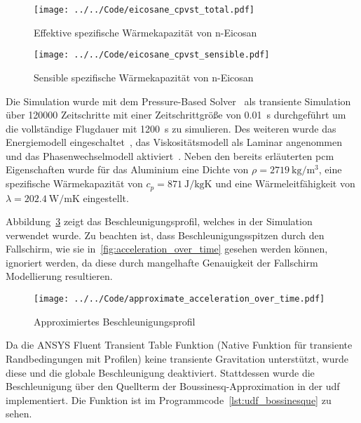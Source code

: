 \begin{figure}[H]
  \centering
  \texttt{[image: ../../Code/eicosane\_cpvst\_total.pdf]}
  \caption{Effektive spezifische Wärmekapazität von n-Eicosan}\label{fig:pcm_effective_cp}
\end{figure}

\begin{figure}[H]
  \centering
  \texttt{[image: ../../Code/eicosane\_cpvst\_sensible.pdf]}
  \caption{Sensible spezifische Wärmekapazität von n-Eicosan}\label{fig:pcm_sensible_cp}
\end{figure}

Die Simulation wurde mit dem Pressure-Based Solver~\cite{akamcae-udf} als transiente Simulation über 120000 Zeitschritte mit einer Zeitschrittgröße von \SI{0,01}{\second} durchgeführt
um die vollständige Flugdauer mit \SI{1200}{\second} zu simulieren.
Des weiteren wurde das Energiemodell eingeschaltet~\cite{akamcae-udf}, das Viskositätsmodell als Laminar angenommen~\cite{akamcae-udf} und das Phasenwechselmodell aktiviert~\cite{akamcae-udf}.
Neben den bereits erläuterten \ac{pcm} Eigenschaften wurde für das Aluminium eine Dichte von $\rho = \SI{2719}{\kilogram\per\meter\cubed}$,
eine spezifische Wärmekapazität von $c_p = \SI{871}{\joule\per\kilogram\kelvin}$ und eine Wärmeleitfähigkeit von $\lambda = \SI{202.4}{\watt\per\meter\kelvin}$
eingestellt.

Abbildung~\ref{fig:approximierte_beschleunigung} zeigt das Beschleunigungsprofil, welches in der Simulation verwendet wurde. Zu beachten
ist, dass Beschleunigungsspitzen durch den Fallschirm, wie sie in~\ref{fig:acceleration_over_time} gesehen
werden können, ignoriert werden, da diese durch mangelhafte Genauigkeit der Fallschirm Modellierung resultieren.

\begin{figure}
  \centering
  \texttt{[image: ../../Code/approximate\_acceleration\_over\_time.pdf]}
  \caption{Approximiertes Beschleunigungsprofil}\label{fig:approximierte_beschleunigung}
\end{figure}

Da die ANSYS Fluent Transient Table Funktion (Native Funktion für transiente Randbedingungen mit Profilen) keine transiente Gravitation
unterstützt, wurde diese und die globale Beschleunigung deaktiviert.
Stattdessen wurde die Beschleunigung über den Quellterm der Boussinesq-Approximation in der \ac{udf} implementiert. Die Funktion ist im
Programmcode~\ref{lst:udf_bossinesque} zu sehen.

